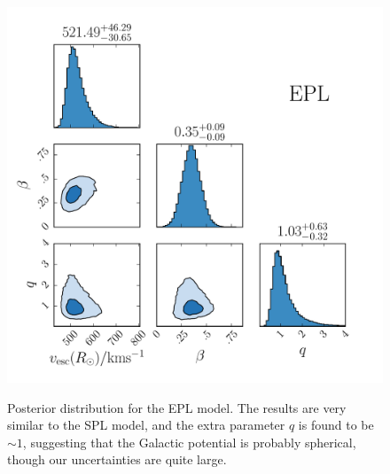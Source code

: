 \documentclass[useAMS,twocolumn,usenatbib]{mn2e}
\begin{document}
\begin{figure}
\includegraphics[width=\columnwidth]{plots/corner_flattened_powerlaw}\\
\caption{Posterior distribution for the EPL model. 
The results are very similar to the SPL model, and the extra parameter $q$ is found to be $\sim 1$, suggesting that the Galactic potential is probably spherical, though our uncertainties are quite large.}
\label{fig:EPL_posterior}
\end{figure}
\end{document}
